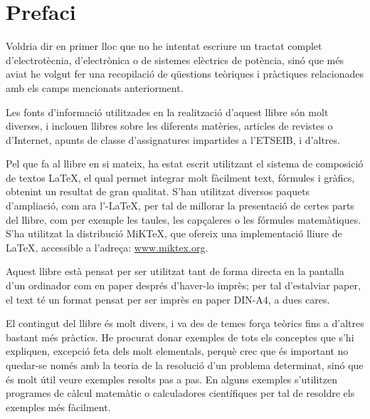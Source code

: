 \chapter*{Prefaci} 

   Voldria dir en primer lloc que no he intentat escriure un tractat complet
   d'electrotècnia, d'electrònica o de sistemes elèctrics de potència, sinó que més aviat
   he volgut
   fer una recopilació de qüestions teòriques i pràctiques relacionades amb els camps mencionats
   anteriorment.

   Les fonts d'informació utilitzades en la realització d'aquest llibre són molt diverses,
   i inclouen llibres sobre les diferents matèries, articles de revistes o d'Internet,
   apunts de classe d'assignatures impartides a l'ETSEIB, i d'altres.

   Pel que fa al llibre en si mateix, ha estat escrit utilitzant el sistema de composició de
   textos \LaTeX, el qual
   permet integrar molt fàcilment text, fórmules i gràfics, obtenint un resultat de
   gran qualitat. S'han utilitzat diversos paquets d'ampliació, com ara
   l'\AmS-\LaTeX,
   per tal de millorar la presentació de certes parts del
   llibre, com per exemple les taules, les capçaleres o les fórmules matemàtiques. S'ha utilitzat la distribució MiK\TeX, que ofereix una implementació lliure de \LaTeX , accessible a l'adreça: \href{http://www.miktex.org/}{www.miktex.org}.

   Aquest llibre està pensat per  ser utilitzat tant de forma directa en la pantalla d'un
   ordinador com en paper després d'haver-lo imprès; per tal d'estalviar paper, el text
   té un format pensat per  ser imprès en paper DIN-A4, a dues cares.

    El contingut del llibre és molt divers, i va des de temes força teòrics fins a
    d'altres bastant més pràctics. He procurat donar exemples de tots els conceptes
    que s'hi expliquen, excepció feta dels molt elementals, perquè crec que és important
     no quedar-se només amb la teoria de  la resolució d'un problema determinat, sinó que
     és molt útil veure exemples resolts pas a pas. En alguns exemples s'utilitzen programes de càlcul matemàtic o calculadores científiques per tal de resoldre els exemples més fàcilment. 


